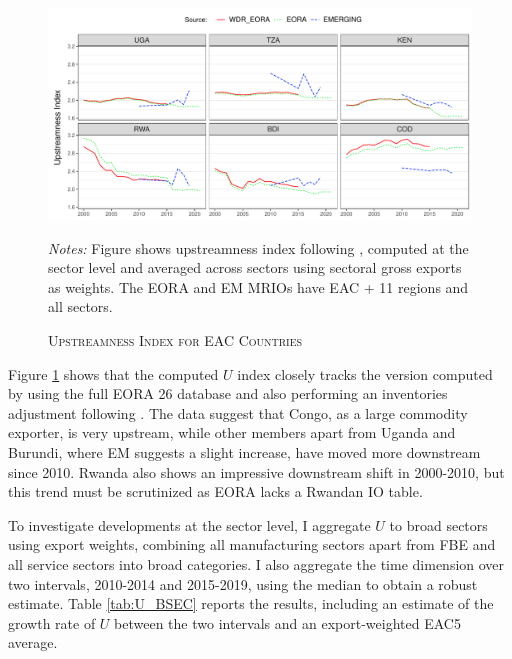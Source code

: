\documentclass[a4paper]{article}
\begin{document}
\begin{figure}[h!]
\centering
\caption{\label{fig:EACUS_ag_ts}\textsc{Upstreamness Index for EAC Countries}}
\includegraphics[width=1\textwidth]{"Upstreamness_ag_ts.pdf"} \\ \raggedright
\scriptsize
\emph{Notes:} Figure shows upstreamness index following \citet{antras2012measuring}, computed at the sector level and averaged across sectors using sectoral gross exports as weights. The EORA and EM MRIOs have EAC + 11 regions and all sectors.  
\end{figure}
\FloatBarrier

Figure \ref{fig:EACUS_ag_ts} shows that the computed $U$ index closely tracks the version computed by \citet{mancini2023positioning} using the full EORA 26 database and also performing an inventories adjustment following \citet{antras2018measurement}. The data suggest that Congo, as a large commodity exporter, is very upstream, while other members apart from Uganda and Burundi, where EM suggests a slight increase, have moved more downstream since 2010. Rwanda also shows an impressive downstream shift in 2000-2010, but this trend must be scrutinized as EORA lacks a Rwandan IO table. \newline

To investigate developments at the sector level, I aggregate $U$ to broad sectors using export weights, combining all manufacturing sectors apart from FBE and all service sectors into broad categories. I also aggregate the time dimension over two intervals, 2010-2014 and 2015-2019, using the median to obtain a robust estimate. Table \ref{tab:U_BSEC} reports the results, including an estimate of the growth rate of $U$ between the two intervals and an export-weighted EAC5 average. \newline 
\end{document}
